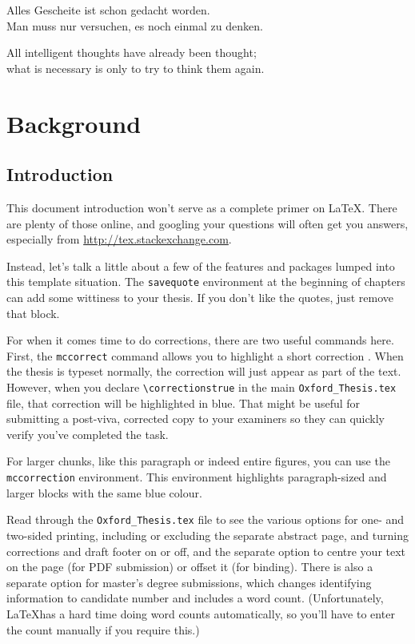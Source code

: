\begin{savequote}[8cm]
Alles Gescheite ist schon gedacht worden.\\
Man muss nur versuchen, es noch einmal zu denken.

All intelligent thoughts have already been thought;\\
what is necessary is only to try to think them again.
\end{savequote}

\chapter{\label{ch:2-litreview}Background}

\minitoc

\section{Introduction}

This document introduction won't serve as a complete primer on \LaTeX.  There are plenty of those online, and googling your questions will often get you answers, especially from \url{http://tex.stackexchange.com}.

Instead, let's talk a little about a few of the features and packages lumped into this template situation.  The \verb|savequote| environment at the beginning of chapters can add some wittiness to your thesis.  If you don't like the quotes, just remove that block.

For when it comes time to do corrections, there are two useful commands here.  First, the \verb|mccorrect| command allows you to highlight a short correction .  When the thesis is typeset normally, the correction will just appear as part of the text.  However, when you declare \verb|\correctionstrue| in the main \verb|Oxford_Thesis.tex| file, that correction will be highlighted in blue.  That might be useful for submitting a post-viva, corrected copy to your examiners so they can quickly verify you've completed the task.

\begin{mccorrection}
For larger chunks, like this paragraph or indeed entire figures, you can use the \verb|mccorrection| environment.  This environment highlights paragraph-sized and larger blocks with the same blue colour.
\end{mccorrection}

Read through the \verb|Oxford_Thesis.tex| file to see the various options for one- and two-sided printing, including or excluding the separate abstract page, and turning corrections and draft footer on or off, and the separate option to centre your text on the page (for PDF submission) or offset it (for binding).  There is also a separate option for master's degree submissions, which changes identifying information to candidate number and includes a word count.  (Unfortunately, \LaTeX has a hard time doing word counts automatically, so you'll have to enter the count manually if you require this.)

